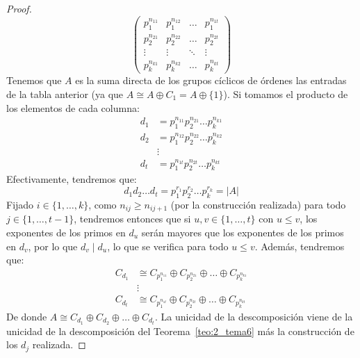 \begin{teo}
\begin{proof}
        \begin{equation*}
            \left(\begin{array}{cccc}
                p_1^{n_{11}} & p_1^{n_{12}} & \ldots & p_1^{n_{1t}} \\
                p_2^{n_{21}} & p_2^{n_{22}} & \ldots  & p_2^{n_{2t}}  \\
                 \vdots & \vdots & \ddots & \vdots \\
                 p_k^{n_{k1}} & p_k^{n_{k2}} & \ldots & p_k^{n_{kt}}  
            \end{array}\right)
        \end{equation*}
        Tenemos que $A$ es la suma directa de los grupos cíclicos de órdenes las entradas de la tabla anterior (ya que $A \cong A \oplus C_1 = A\oplus \{1\}$). Si tomamos el producto de los elementos de cada columna:
        \begin{align*}
            d_1 &= p_1^{n_{11}}p_2^{n_{21}} \ldots p_k^{n_{k1}} \\
            d_2 &= p_1^{n_{12}}p_2^{n_{22}} \ldots p_k^{n_{k2}} \\
                &\vdots \\
            d_t &= p_1^{n_{1t}}p_2^{n_{2t}} \ldots p_k^{n_{kt}} 
        \end{align*}
        Efectivamente, tendremos que:
        \begin{equation*}
            d_1d_2 \ldots d_t = p_1^{r_1} p_2^{r_2} \ldots p_k^{r_k} = |A|
        \end{equation*}
        Fijado $i \in \{1,\ldots,k\}$, como $n_{ij}\geq n_{ij+1}$ (por la construcción realizada) para todo $j \in \{1,\ldots,t-1\}$, tendremos entonces que si $u,v\in \{1,\ldots,t\}$ con $u\leq v$, los exponentes de los primos en $d_u$ serán mayores que los exponentes de los primos en $d_v$, por lo que $d_v \mid d_u$, lo que se verifica para todo $u\leq v$. Además, tendremos que:
        \begin{align*}
            C_{d_1} &\cong C_{p_1^{n_{11}}} \oplus C_{p_2^{n_{21}}} \oplus \ldots \oplus C_{p_k^{n_{k1}}} \\
                    &\vdots \\
            C_{d_t} &\cong C_{p_1^{n_{1t}}} \oplus C_{p_2^{n_{2t}}} \oplus \ldots \oplus C_{p_k^{n_{kt}}} 
        \end{align*}
        De donde $A \cong C_{d_1}\oplus C_{d_2}\oplus \ldots \oplus C_{d_t}$. La unicidad de la descomposición viene de la unicidad de la descomposición del Teorema~\ref{teo:2_tema6} más la construcción de los $d_j$ realizada.
    \end{proof} 
\end{teo}


